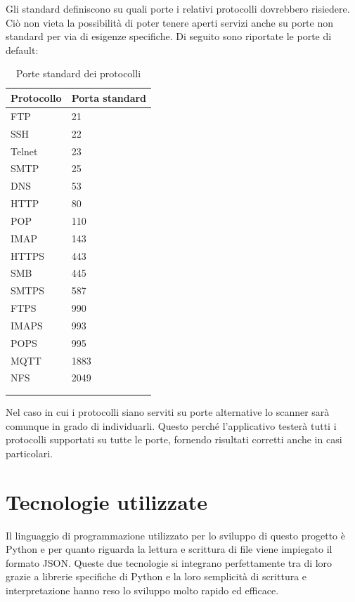 \documentclass[12pt]{report}
\begin{document}
Gli standard definiscono su quali porte i relativi protocolli dovrebbero risiedere. Ciò non vieta la possibilità di poter tenere aperti servizi anche su porte non standard per via di esigenze specifiche. Di seguito sono riportate le porte di default:
\begin{center}
\begin{longtable}{@{}m{3cm}m{3cm}@{}}
\toprule
\textbf{Protocollo} & \textbf{Porta standard} \\ \midrule
FTP & 21 \\ 
SSH & 22 \\ 
Telnet & 23 \\ 
SMTP & 25 \\ 
DNS & 53 \\ 
HTTP & 80 \\ 
POP & 110 \\ 
IMAP & 143 \\ 
HTTPS & 443 \\ 
SMB & 445 \\ 
SMTPS & 587 \\ 
FTPS & 990 \\
IMAPS & 993 \\ 
POPS & 995 \\
MQTT & 1883 \\ 
NFS & 2049 \\ \bottomrule
\\
\caption{Porte standard dei protocolli}
\label{tab:porte_standard}
\end{longtable}
\end{center}

Nel caso in cui i protocolli siano serviti su porte alternative lo scanner sarà comunque in grado di individuarli. Questo perché l'applicativo testerà tutti i protocolli supportati su tutte le porte, fornendo risultati corretti anche in casi particolari.

\section{Tecnologie utilizzate}

Il linguaggio di programmazione utilizzato per lo sviluppo di questo progetto è Python e per quanto riguarda la lettura e scrittura di file viene impiegato il formato JSON. Queste due tecnologie si integrano perfettamente tra di loro grazie a librerie specifiche di Python e la loro semplicità di scrittura e interpretazione hanno reso lo sviluppo molto rapido ed efficace.
\end{document}

